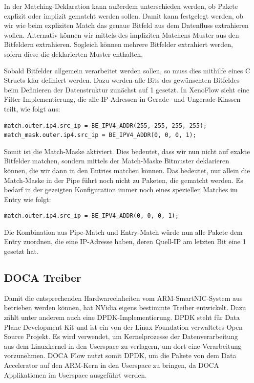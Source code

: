 In der Matching-Deklaration kann außerdem unterschieden werden, ob Pakete explizit oder implizit gematcht werden sollen. Damit kann festgelegt werden, ob wir wie beim expliziten Match das genaue Bitfeld aus dem Datenfluss extrahieren wollen. Alternativ können wir mittels des impliziten Matchens Muster aus den Bitfeldern extrahieren. Sogleich können mehrere Bitfelder extrahiert werden, sofern diese die deklarierten Muster enthalten.


Sobald Bitfelder allgemein verarbeitet werden sollen, so muss dies mithilfe eines C Structs klar definiert werden. Dazu werden alle Bits des gewünschten Bitfeldes beim Definieren der Datenstruktur zunächst auf 1 gesetzt.
In XenoFlow sieht eine Filter-Implementierung, die alle IP-Adressen in Gerade- und Ungerade-Klassen teilt, wie folgt aus:
\begin{verbatim}
match.outer.ip4.src_ip = BE_IPV4_ADDR(255, 255, 255, 255);
match_mask.outer.ip4.src_ip = BE_IPV4_ADDR(0, 0, 0, 1);
\end{verbatim}
Somit ist die Match-Maske aktiviert. Dies bedeutet, dass wir nun nicht auf exakte Bitfelder matchen, sondern mittels der Match-Maske Bitmuster deklarieren können, die wir dann in den Entries matchen können. Das bedeutet, nur allein die Match-Maske in der Pipe führt noch nicht zu Paketen, die gematcht werden. Es bedarf in der gezeigten Konfiguration immer noch eines speziellen Matches im Entry wie folgt: 
\begin{verbatim}
match.outer.ip4.src_ip = BE_IPV4_ADDR(0, 0, 0, 1);
\end{verbatim}
Die Kombination aus Pipe-Match und Entry-Match würde nun alle Pakete dem Entry zuordnen, die eine IP-Adresse haben, deren Quell-IP am letzten Bit eine 1 gesetzt hat.
\subsection{DOCA Treiber}
Damit die entsprechenden Hardwareeinheiten vom ARM-SmartNIC-System aus betrieben werden können, hat NVidia eigens bestimmte Treiber entwickelt. Dazu zählt unter anderem auch eine DPDK-Implementierung. DPDK steht für Data Plane Development Kit und ist ein von der Linux Foundation verwaltetes Open Source Projekt. Es wird verwendet, um Kernelprozesse der Datenverarbeitung aus dem Linuxkernel in den Userspace zu verlagern, um dort eine Verarbeitung vorzunehmen. DOCA Flow nutzt somit DPDK, um die Pakete von dem Data Accelerator auf den ARM-Kern in den Userspace zu bringen, da DOCA Applikationen im Userspace ausgeführt werden. 

